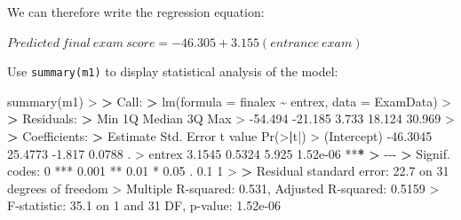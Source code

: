 \documentclass[
]{book}
\newenvironment{Shaded}{\begin{snugshade}}{\end{snugshade}}
\newcommand{\AttributeTok}[1]{\textcolor[rgb]{0.77,0.63,0.00}{#1}}
\newcommand{\DecValTok}[1]{\textcolor[rgb]{0.00,0.00,0.81}{#1}}
\newcommand{\ErrorTok}[1]{\textcolor[rgb]{0.64,0.00,0.00}{\textbf{#1}}}
\newcommand{\FloatTok}[1]{\textcolor[rgb]{0.00,0.00,0.81}{#1}}
\newcommand{\FunctionTok}[1]{\textcolor[rgb]{0.00,0.00,0.00}{#1}}
\newcommand{\NormalTok}[1]{#1}
\newcommand{\SpecialCharTok}[1]{\textcolor[rgb]{0.00,0.00,0.00}{#1}}
\newcommand{\StringTok}[1]{\textcolor[rgb]{0.31,0.60,0.02}{#1}}
\theoremstyle{definition}
\theoremstyle{definition}
\theoremstyle{definition}
\theoremstyle{definition}
\theoremstyle{remark}
\begin{document}
We can therefore write the regression equation:

\(Predicted\ final\ exam\ score = -46.305 + 3.155(entrance\ exam)\)

\hfill\break
\hfill\break
Use \texttt{summary(m1)} to display statistical analysis of the model:

\begin{Shaded}
\begin{Highlighting}[]
\FunctionTok{summary}\NormalTok{(m1)}
\SpecialCharTok{\textgreater{}} 
\ErrorTok{\textgreater{}}\NormalTok{ Call}\SpecialCharTok{:}
\ErrorTok{\textgreater{}} \FunctionTok{lm}\NormalTok{(}\AttributeTok{formula =}\NormalTok{ finalex }\SpecialCharTok{\textasciitilde{}}\NormalTok{ entrex, }\AttributeTok{data =}\NormalTok{ ExamData)}
\SpecialCharTok{\textgreater{}} 
\ErrorTok{\textgreater{}}\NormalTok{ Residuals}\SpecialCharTok{:}
\ErrorTok{\textgreater{}}\NormalTok{     Min      1Q  Median      3Q     Max }
\SpecialCharTok{\textgreater{}} \SpecialCharTok{{-}}\FloatTok{54.494} \SpecialCharTok{{-}}\FloatTok{21.185}   \FloatTok{3.733}  \FloatTok{18.124}  \FloatTok{30.969} 
\SpecialCharTok{\textgreater{}} 
\ErrorTok{\textgreater{}}\NormalTok{ Coefficients}\SpecialCharTok{:}
\ErrorTok{\textgreater{}}\NormalTok{             Estimate Std. Error t value }\FunctionTok{Pr}\NormalTok{(}\SpecialCharTok{\textgreater{}}\ErrorTok{|}\NormalTok{t}\SpecialCharTok{|}\NormalTok{)    }
\SpecialCharTok{\textgreater{}}\NormalTok{ (Intercept) }\SpecialCharTok{{-}}\FloatTok{46.3045}    \FloatTok{25.4773}  \SpecialCharTok{{-}}\FloatTok{1.817}   \FloatTok{0.0788}\NormalTok{ .  }
\SpecialCharTok{\textgreater{}}\NormalTok{ entrex        }\FloatTok{3.1545}     \FloatTok{0.5324}   \FloatTok{5.925} \FloatTok{1.52e{-}06} \SpecialCharTok{**}\ErrorTok{*}
\ErrorTok{\textgreater{}} \SpecialCharTok{{-}{-}{-}}
\ErrorTok{\textgreater{}}\NormalTok{ Signif. codes}\SpecialCharTok{:}  \DecValTok{0} \StringTok{\textquotesingle{}***\textquotesingle{}} \FloatTok{0.001} \StringTok{\textquotesingle{}**\textquotesingle{}} \FloatTok{0.01} \StringTok{\textquotesingle{}*\textquotesingle{}} \FloatTok{0.05} \StringTok{\textquotesingle{}.\textquotesingle{}} \FloatTok{0.1} \StringTok{\textquotesingle{} \textquotesingle{}} \DecValTok{1}
\SpecialCharTok{\textgreater{}} 
\ErrorTok{\textgreater{}}\NormalTok{ Residual standard error}\SpecialCharTok{:} \FloatTok{22.7}\NormalTok{ on }\DecValTok{31}\NormalTok{ degrees of freedom}
\SpecialCharTok{\textgreater{}}\NormalTok{ Multiple R}\SpecialCharTok{{-}}\NormalTok{squared}\SpecialCharTok{:}  \FloatTok{0.531}\NormalTok{,   Adjusted R}\SpecialCharTok{{-}}\NormalTok{squared}\SpecialCharTok{:}  \FloatTok{0.5159} 
\SpecialCharTok{\textgreater{}}\NormalTok{ F}\SpecialCharTok{{-}}\NormalTok{statistic}\SpecialCharTok{:}  \FloatTok{35.1}\NormalTok{ on }\DecValTok{1}\NormalTok{ and }\DecValTok{31}\NormalTok{ DF,  p}\SpecialCharTok{{-}}\NormalTok{value}\SpecialCharTok{:} \FloatTok{1.52e{-}06}
\end{Highlighting}
\end{Shaded}
\end{document}
